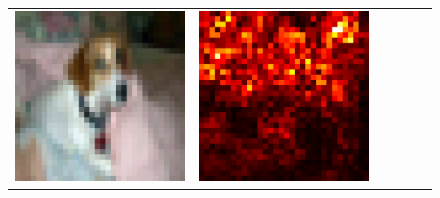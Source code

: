 \documentclass[preprint,12pt]{elsarticle}
\begin{document}
\begin{figure}[p]
\begin{tabular}{cccccc}
  \includegraphics[scale=\scale]{../visualizations/examples/cifar10/cnn/images/5.png} &
  \includegraphics[scale=\scale]{../visualizations/examples/cifar10/cnn/saliency_map/5.png} & 

\end{tabular}
\end{figure}
\end{document}
